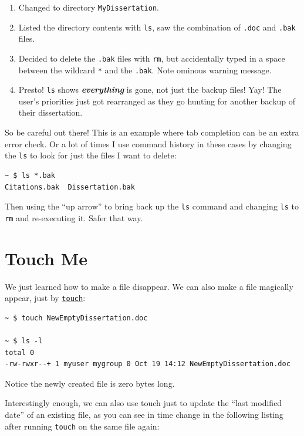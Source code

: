 \documentclass[10pt,]{book}
\numberwithin{figure}{chapter}
\begin{document}
\begin{enumerate}
\def\labelenumi{\arabic{enumi}.}
\item
  Changed to directory \texttt{MyDissertation}.
\item
  Listed the directory contents with \texttt{ls}, saw the combination of
  \texttt{.doc} and \texttt{.bak} files.
\item
  Decided to delete the \texttt{.bak} files with \texttt{rm}, but
  accidentally typed in a space between the wildcard \texttt{*} and the
  \texttt{.bak}. Note ominous warning message.
\item
  Presto! \texttt{ls} shows \textbf{\emph{everything}} is gone, not just
  the backup files! Yay! The user's priorities just got rearranged as
  they go hunting for another backup of their dissertation.
\end{enumerate}

So be careful out there! This is an example where tab completion can be
an extra error check. Or a lot of times I use command history in these
cases by changing the \texttt{ls} to look for just the files I want to
delete:

\begin{verbatim}
~ $ ls *.bak
Citations.bak  Dissertation.bak
\end{verbatim}

Then using the ``up arrow'' to bring back up the \texttt{ls} command and
changing \texttt{ls} to \texttt{rm} and re-executing it. Safer that way.

\section{Touch Me}\label{touch-me}

We just learned how to make a file disappear. We can also make a file
magically appear, just by
\href{http://linux.die.net/man/1/touch}{\texttt{touch}}:

\begin{verbatim}
~ $ touch NewEmptyDissertation.doc

~ $ ls -l
total 0
-rw-rwxr--+ 1 myuser mygroup 0 Oct 19 14:12 NewEmptyDissertation.doc
\end{verbatim}

Notice the newly created file is zero bytes long.

Interestingly enough, we can also use touch just to update the ``last
modified date'' of an existing file, as you can see in time change in
the following listing after running \texttt{touch} on the same file
again:
\end{document}
